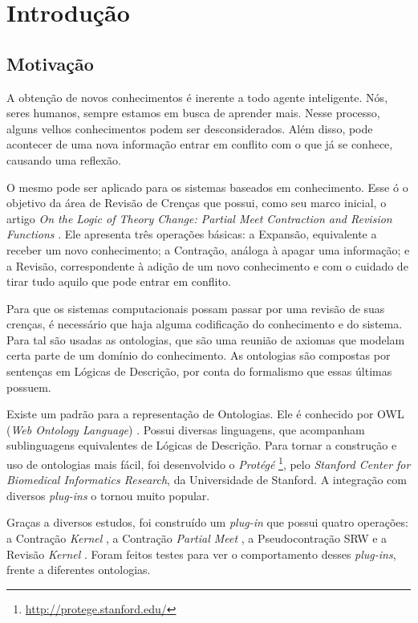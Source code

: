\chapter{Introdução}

\section{Motivação}

A obtenção de novos conhecimentos é inerente a todo agente inteligente. Nós, seres humanos, sempre estamos em busca de aprender mais. Nesse processo, alguns velhos conhecimentos podem ser desconsiderados. Além disso, pode acontecer de uma nova informação entrar em conflito com o que já se conhece, causando uma reflexão.

O mesmo pode ser aplicado para os sistemas baseados em conhecimento. Esse ó o objetivo da área de Revisão de Crenças que possui, como seu marco inicial, o artigo \textit{On the Logic of Theory Change: Partial Meet Contraction and Revision Functions} \citep{revisaoAGM}. Ele apresenta três operações básicas: a Expansão, equivalente a receber um novo conhecimento; a Contração, análoga à apagar uma informação; e a Revisão, correspondente à adição de um novo conhecimento e com o cuidado de tirar tudo aquilo que pode entrar em conflito.

Para que os sistemas computacionais possam passar por uma revisão de suas crenças, é necessário que haja alguma codificação do conhecimento e do sistema. Para tal são usadas as ontologias, que são uma reunião de axiomas que modelam certa parte de um domínio do conhecimento. As ontologias são compostas por sentenças em Lógicas de Descrição, por conta do formalismo que essas últimas possuem.

Existe um padrão para a representação de Ontologias. Ele é conhecido por OWL (\textit{Web Ontology Language}) \citep{ferramentasOWL2}. Possui diversas linguagens, que acompanham sublinguagens equivalentes de Lógicas de Descrição. Para tornar a construção e uso de ontologias mais fácil, foi desenvolvido o \textit{Protégé} \footnote{\url{http://protege.stanford.edu/}}, pelo \textit{Stanford Center for Biomedical Informatics Research}, da Universidade de Stanford. A integração com diversos \textit{plug-ins} o tornou muito popular.  

Graças a diversos estudos, foi construído um \textit{plug-in} que possui quatro operações: a Contração \textit{Kernel} \citep{revisaoHansson5}, a Contração \textit{Partial Meet} \citep{revisaoAGM}, a Pseu\-do\-con\-tra\-ção SRW \citep{revisaoSantos} e a Revisão \textit{Kernel} \citep{revisaoRibeiro2}. Foram feitos testes para ver o comportamento desses \textit{plug-ins}, frente a diferentes ontologias.


